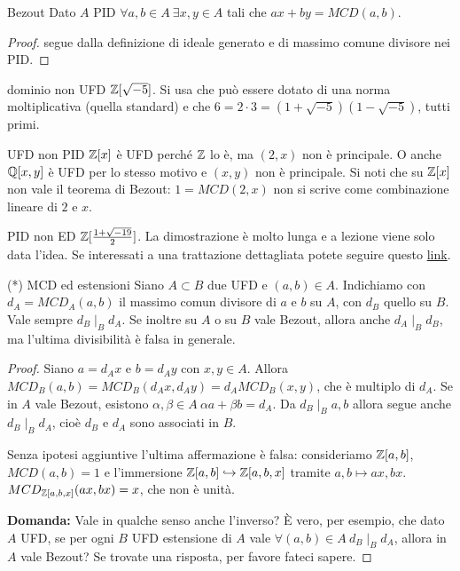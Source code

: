 \begin{theorem}{Bezout} 
    Dato $A$ PID $\forall a,b \in A \ \exists x,y \in A$ tali che $ax + by = MCD(a,b)$.
\end{theorem}
\begin{proof}
    segue dalla definizione di ideale generato e di massimo comune divisore nei PID.
\end{proof}
\begin{example2}{dominio non UFD}
    $\mathbb{Z}[\sqrt{-5}]$. Si usa che può essere dotato di una norma moltiplicativa (quella standard) e che $6 = 2 \cdot 3 = (1 + \sqrt{-5})(1 - \sqrt{-5})$, tutti primi.
\end{example2}
\begin{example2}{UFD non PID}
    $\mathbb{Z}[x]$ è UFD perché $\mathbb{Z}$ lo è, ma $(2,x)$ non è principale. O anche $\mathbb{Q}[x,y]$ è UFD per lo stesso motivo e $(x,y)$ non è principale. Si noti che su $\mathbb{Z}[x]$ non vale il teorema di Bezout: $1 = MCD(2, x)$ non si scrive come combinazione lineare di $2$ e $x$.
\end{example2}
\begin{example2}{PID non ED}
    $\mathbb{Z}[\frac{1 + \sqrt{-19}}{2}]$.
    La dimostrazione è molto lunga e a lezione viene solo data l'idea. Se interessati a una trattazione dettagliata potete seguire questo \href{https://www.jstor.org/stable/2322908}{link}.
\end{example2}

\begin{proposition}{(*) MCD ed estensioni}
    Siano $A \subset B$ due UFD e $(a, b) \in A$. Indichiamo con $d_A = MCD_A(a, b)$ il massimo comun divisore di $a$ e $b$ su $A$, con $d_B$ quello su $B$. Vale sempre $d_B \mid_B d_A$. Se inoltre su $A$ o su $B$ vale Bezout, allora anche $d_A \mid_B d_B$, ma l'ultima divisibilità è falsa in generale.
\end{proposition}
\begin{proof}
    Siano $a = d_A x$ e $b = d_A y$ con $x, y \in A$. Allora $MCD_B(a, b) = MCD_B(d_A x, d_A y) = d_A MCD_B(x, y)$, che è multiplo di $d_A$. Se in $A$ vale Bezout, esistono $\alpha, \beta \in A \ \alpha a + \beta b = d_A$. Da $d_B \mid_B a, b$ allora segue anche $d_B \mid_B d_A$, cioè $d_B$ e $d_A$ sono associati in $B$.

    Senza ipotesi aggiuntive l'ultima affermazione è falsa: consideriamo $\mathbb{Z}[a, b]$, $MCD(a, b) = 1$ e l'immersione $\mathbb{Z}[a, b] \hookrightarrow \mathbb{Z}[a, b, x]$ tramite $a, b \mapsto ax, bx$. $MCD_{\mathbb{Z}[a, b, x]}(ax, bx) = x$, che non è unità.

    \textbf{Domanda:} Vale in qualche senso anche l'inverso? È vero, per esempio, che dato $A$ UFD, se per ogni $B$ UFD estensione di $A$ vale $\forall (a, b) \in A \ d_B \mid_B d_A$, allora in $A$ vale Bezout? Se trovate una risposta, per favore fateci sapere.
\end{proof}

